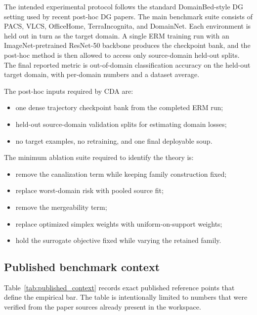\documentclass{article}
\theoremstyle{definition}
\newcommand{\cda}{\textup{\textsc{CDA}}}
\begin{document}
The intended experimental protocol follows the standard DomainBed-style DG setting used by recent post-hoc DG papers. The main benchmark suite consists of PACS, VLCS, OfficeHome, TerraIncognita, and DomainNet. Each environment is held out in turn as the target domain. A single ERM training run with an ImageNet-pretrained ResNet-50 backbone produces the checkpoint bank, and the post-hoc method is then allowed to access only source-domain held-out splits. The final reported metric is out-of-domain classification accuracy on the held-out target domain, with per-domain numbers and a dataset average.

The post-hoc inputs required by \cda{} are:
\begin{itemize}[leftmargin=1.3em]
    \item one dense trajectory checkpoint bank from the completed ERM run;
    \item held-out source-domain validation splits for estimating domain losses;
    \item no target examples, no retraining, and one final deployable soup.
\end{itemize}
The minimum ablation suite required to identify the theory is:
\begin{itemize}[leftmargin=1.3em]
    \item remove the canalization term while keeping family construction fixed;
    \item replace worst-domain risk with pooled source fit;
    \item remove the mergeability term;
    \item replace optimized simplex weights with uniform-on-support weights;
    \item hold the surrogate objective fixed while varying the retained family.
\end{itemize}

\subsection{Published benchmark context}

Table~\ref{tab:published_context} records exact published reference points that define the empirical bar. The table is intentionally limited to numbers that were verified from the paper sources already present in the workspace.
\end{document}
